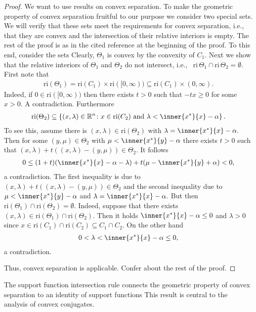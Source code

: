 \begin{proof}
  \emph{\cite[Theorem~4.23]{Mordukhovich2022}}
  We want to use results on convex separation. To make the geometric property of convex separation fruitful
  to our purpose we consider two special sets. We will verify that these sets meet the requirements for convex separation, i.e., that they are convex and the intersection of their relative interiors is empty. The rest of the proof is as in the cited reference at the beginning of the proof.
  To this end, consider 
  the sets
  Clearly, $\Theta_1$ is convex by the convexity of $C_1$.
   Next we show that the relative interiors of 
  $\Theta_1$ and $\Theta_2$
  do not intersect, i.e.,
  ~$
  \mathrm{ri}\,\Theta_1\cap\mathrm{ri}\,\Theta_2=\emptyset.
  $
  First note that
  \begin{gather}
    \mathrm{ri}(\Theta_1)
    =
    \mathrm{ri}(C_1)
    \times
    \mathrm{ri}([0,\infty))
    \subseteq
    \mathrm{ri}(C_1)
    \times
    (0,\infty).
  \end{gather}
  Indeed, if 
  $
    0\in
    \mathrm{ri}([0,\infty))
  $
  then there exists $t>0$ such that $-tx\ge 0$ for some $x>0.$ A contradiction.
  Furthermore
\begin{gather}
  \mathrm{ri}(\Theta_2)
  \subseteq
    \left\{ 
      (x,\lambda)\in \R^n
      \colon
      x \in \mathrm{ri}(C_2) 
      \ 
      \text{and}
      \ 
      \lambda
      <
      \inner{x^*}{x} - \alpha
    \right\}.
\end{gather}
To see this, assume there is 
$
(x,\lambda)
\in \mathrm{ri}(\Theta_2)
$
with
$
      \lambda
      =
      \inner{x^*}{x} - \alpha
      .
$
Then for some 
$
  (y,\mu)
  \in \Theta_2
$
with
$
      \mu    
      <
      \inner{x^*}{y} - \alpha
$
there exists $t>0$ such that 
$
  (x,\lambda)
  +
  t
  (
  (x,\lambda)
  -
  (y,\mu)
  )
  \in \Theta_2.
$
It follows
\begin{align}
  0
  \le
  (1+t)(\inner{x^*}{x}-\alpha -\lambda)
  +
  t
  (
    \mu 
    -\inner{x^*}{y}
    +
    \alpha
  )
  <0
,
\end{align}
a contradiction.
The first inequality is due to 
$
  (x,\lambda)
  +
  t
  (
  (x,\lambda)
  -
  (y,\mu)
  )
  \in \Theta_2
$
and the second inequality due to
$
      \mu    
      <
      \inner{x^*}{y} - \alpha
$
and
$
      \lambda
      =
      \inner{x^*}{x} - \alpha
      .
$
But then 
$
\mathrm{ri}(\Theta_1)\cap\mathrm{ri}(\Theta_2)=\emptyset
.
$
Indeed, suppose that there exists 
$
  (x,\lambda)
  \in
  \mathrm{ri}(\Theta_1)\cap\mathrm{ri}(\Theta_2)
  .
$
Then it holds
$
  \inner{x^*}{x}
  -
  \alpha
  \le
  0
$
and $\lambda>0$
since 
$
 x
 \in
  \mathrm{ri}(C_1)\cap\mathrm{ri}(C_2)
  \subseteq
  C_1\cap C_2.
$
On the other hand
\begin{gather}
  0
  <
  \lambda
  <
  \inner{x^*}{x}
  -
  \alpha
  \le
  0
  ,
\end{gather}
a contradiction.

Thus, convex separation is applicable. Confer \cite[Theorem 4.23]{Mordukhovich2022}
about the rest of the proof.
\end{proof}

\begin{takeaways}
  The support function intersection rule connects the geometric 
  property of convex separation to an identity of support functions
  This result is central to the analysis of convex conjugates.
\end{takeaways}
